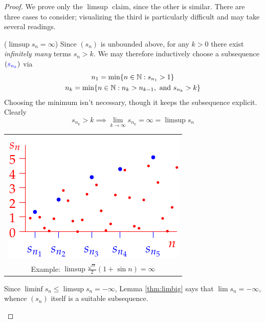\begin{proof}
	We prove only the $\limsup$ claim, since the other is similar. There are three cases to consider; visualizing the third is particularly difficult and may take several readings.
	\begin{description}
	  \begin{minipage}[t]{0.56\linewidth}\vspace{-10pt}
		  \item[\normalfont ($\limsup s_n=\infty$)]\lstsp Since $(s_n)$ is unbounded above, for any $k>0$ there exist \emph{infinitely many} terms $s_n>k$. We may therefore inductively choose a subsequence $(\textcolor{blue}{s_{n_k}})$ via
		  \begin{gather*}
		  	n_1=\min\{n\in\mathbb{N}:s_{n_1}>1\}\\
		  	n_k=\min\{n\in\mathbb{N}:n_k>n_{k-1},\text{ and } s_{n_k}>k\}
		  \end{gather*}
		  Choosing the minimum isn't necessary, though it keeps the subsequence explicit. Clearly
			\[
				s_{n_k}>k\implies \lim_{k\to\infty} s_{n_k}=\infty=\limsup s_n
			\]
	  \end{minipage}
	 	\hfill
	 	\begin{minipage}[t]{0.4\linewidth}\vspace{-10pt}
		  \hfill
		  \begin{tabular}{c@{}}
		  	\includegraphics[scale=0.95]{dominant3}\\
		  	Example: $\limsup \frac{\sqrt n}2(1+\sin n)=\infty$
		  \end{tabular}
	  \end{minipage}
	  
		\item[\normalfont ($\limsup s_n=-\infty$)]\lstsp Since $\liminf s_n\le \limsup s_n=-\infty$, Lemma \ref{thm:limbig} says that $\lim s_n=-\infty$, whence $(s_n)$ itself is a suitable subsequence.
		

\end{description}
\end{proof}
